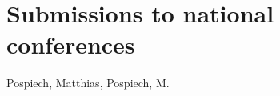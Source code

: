 \section*{Submissions to national conferences}
\begin{refsection}
\nocite{EmonsDPG2009, HoffmannDPG2008, LangDPG2008, VaeckenstedtDPG2010, PospiechDPG2009, PospiechDPG2010, PospiechDPG2011}
\forcsvlist{\listadd\bibboldnames}
  {{Pospiech, Matthias}, {Pospiech, M.}}
\printbibliography[env=numbered+bold, heading=none, sorting=ynt, resetnumbers=true]
\end{refsection}
%
\renewcommand*{\bibboldnames}{}
